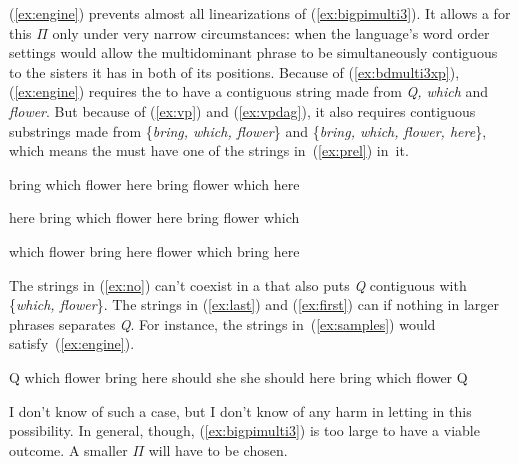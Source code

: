 \documentclass[output=paper]{langsci/langscibook}
\begin{document}
(\ref{ex:engine}) prevents almost all linearizations of (\ref{ex:bigpimulti3}). It allows a  for this $\Pi$ only under very narrow circumstances: when the language's word order settings would allow the multidominant phrase to be simultaneously contiguous to the sisters it has in both of its positions. Because of (\ref{ex:bdmulti3xp}), (\ref{ex:engine}) requires the  to have a contiguous string made from \emph{Q, which} and \emph{flower}. But because of (\ref{ex:vp}) and (\ref{ex:vpdag}), it also requires contiguous substrings made from \{\emph{bring, which, flower}\} and \{\emph{bring, which, flower, here}\}, which means the  must have one of the strings in~(\ref{ex:prel}) in~it.
\begin{exe}
	\ex \label{ex:prel}
	\begin{xlist}
		\ex \label{ex:no}
		\begin{xlist}
		\ex bring which flower here
		\ex bring flower which here
		\end{xlist}
		\ex \label{ex:last}
		\begin{xlist}
		\ex here bring which flower
		\ex here bring flower which
		\end{xlist}
		\ex \label{ex:first}
		\begin{xlist}
		\ex which flower bring here
		\ex flower which bring here
		\end{xlist}
	\end{xlist}
\end{exe}

The strings in (\ref{ex:no}) can't coexist in a  that also puts \emph{Q} contiguous with \{\emph{which, flower}\}. The strings in (\ref{ex:last}) and (\ref{ex:first}) can if nothing in larger phrases separates \emph{Q}. For instance, the strings in~(\ref{ex:samples}) would satisfy~(\ref{ex:engine}).
\begin{exe}
	\ex \label{ex:samples}
	\begin{xlist}
		\ex Q which flower bring here should she
		\ex she should here bring which flower Q
	\end{xlist}
\end{exe}
%
I don't know of such a case, but I don't know of any harm in letting in this possibility. In general, though, (\ref{ex:bigpimulti3}) is too large to have a viable outcome. A smaller $\Pi$ will have to be chosen.
\end{document}
